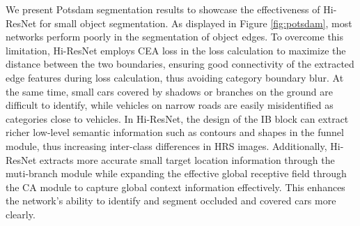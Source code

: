 \documentclass[journal]{IEEEtran}
\begin{document}
We present Potsdam segmentation results to showcase the effectiveness of Hi-ResNet for small object segmentation. As displayed in Figure \ref{fig:potsdam}, most networks perform poorly in the segmentation of object edges. To overcome this limitation, Hi-ResNet employs CEA loss in the loss calculation to maximize the distance between the two boundaries, ensuring good connectivity of the extracted edge features during loss calculation, thus avoiding category boundary blur. At the same time, small cars covered by shadows or branches on the ground are difficult to identify, while vehicles on narrow roads are easily misidentified as categories close to vehicles. In Hi-ResNet, the design of the IB block can extract richer low-level semantic information such as contours and shapes in the funnel module, thus increasing inter-class differences in HRS images. Additionally, Hi-ResNet extracts more accurate small target location information through the muti-branch module while expanding the effective global receptive field through the CA module to capture global context information effectively. This enhances the network's ability to identify and segment occluded and covered cars more clearly.
\end{document}
